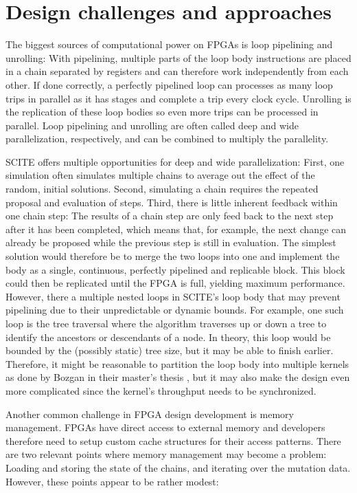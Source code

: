 \section{Design challenges and approaches}

The biggest sources of computational power on \acp{FPGA} is loop pipelining and unrolling: With pipelining, multiple parts of the loop body instructions are placed in a chain separated by registers and can therefore work independently from each other. If done correctly, a perfectly pipelined loop can processes as many loop trips in parallel as it has stages and complete a trip every clock cycle. Unrolling is the replication of these loop bodies so even more trips can be processed in parallel. Loop pipelining and unrolling are often called deep and wide parallelization, respectively, and can be combined to multiply the parallelity.

\ac{SCITE} offers multiple opportunities for deep and wide parallelization: First, one simulation often simulates multiple chains to average out the effect of the random, initial solutions. Second, simulating a chain requires the repeated proposal and evaluation of steps. Third, there is little inherent feedback within one chain step: The results of a chain step are only feed back to the next step after it has been completed, which means that, for example, the next change can already be proposed while the previous step is still in evaluation. The simplest solution would therefore be to merge the two loops into one and implement the body as a single, continuous, perfectly pipelined and replicable block. This block could then be replicated until the \ac{FPGA} is full, yielding maximum performance. However, there a multiple nested loops in \ac{SCITE}'s loop body that may prevent pipelining due to their unpredictable or dynamic bounds. For example, one such loop is the tree traversal where the algorithm traverses up or down a tree to identify the ancestors or descendants of a node. In theory, this loop would be bounded by the (possibly static) tree size, but it may be able to finish earlier. Therefore, it might be reasonable to partition the loop body into multiple kernels as done by Bozgan in their master's thesis \cite{bozgan_2019}, but it may also make the design even more complicated since the kernel's throughput needs to be synchronized.

Another common challenge in \ac{FPGA} design development is memory management. \acp{FPGA} have direct access to external memory and developers therefore need to setup custom cache structures for their access patterns. There are two relevant points where memory management may become a problem: Loading and storing the state of the chains, and iterating over the mutation data. However, these points appear to be rather modest:


